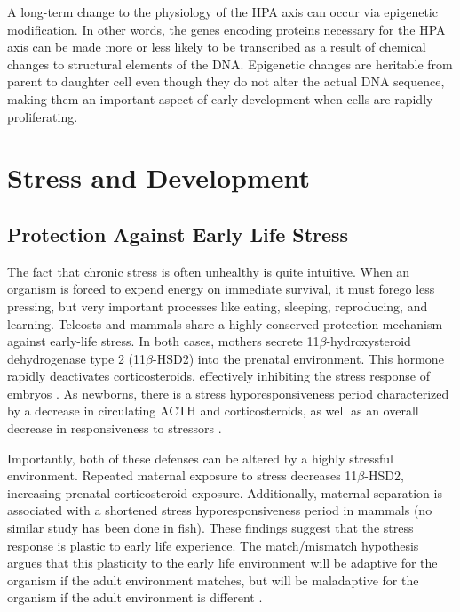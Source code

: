 \documentclass[12pt,twoside]{reedthesis}
\begin{document}
A long-term change to the physiology of the HPA axis can occur via epigenetic
modification. In other words, the genes encoding proteins necessary for the HPA
axis can be made more or less likely to be transcribed as a result of chemical
changes to structural elements of the DNA. Epigenetic changes are heritable from
parent to daughter cell
even though they do not alter the actual DNA sequence, making them an important aspect of early development when cells are rapidly proliferating. 

\section{Stress and Development}
\subsection{Protection Against Early Life Stress} 
The fact that chronic stress is often unhealthy is quite intuitive. When an
organism is forced to expend energy on immediate survival, it must forego less
pressing, but very important processes like eating, sleeping, reproducing, and
learning. Teleosts and mammals share a highly-conserved protection mechanism against
early-life stress. In both cases, mothers secrete 11$\beta$-hydroxysteroid
dehydrogenase type 2 (11$\beta$-HSD2) into the prenatal environment. This hormone rapidly deactivates corticosteroids, effectively
inhibiting the stress response of embryos \citep{van_bodegom_modulation_2017, faught_maternal_2016}. As
newborns, there is a stress hyporesponsiveness period characterized by a
decrease in circulating ACTH and corticosteroids, as well as an overall decrease
in responsiveness to stressors \citep{van_bodegom_modulation_2017, barry_ontogeny_1995}.

Importantly, both of these defenses can be altered by a highly stressful
environment. Repeated maternal exposure to stress decreases 11$\beta$-HSD2,
increasing prenatal corticosteroid exposure. Additionally, maternal separation is
associated with a shortened stress hyporesponsiveness period in mammals (no
similar study has been done in fish). These findings suggest that the stress
response is plastic to early life experience. The match/mismatch hypothesis
argues that this plasticity to the early life environment will be adaptive for
the organism if the adult environment matches, but will be maladaptive for the
organism if the adult environment is different \citep{gluckman_early_2007}. 
\end{document}
